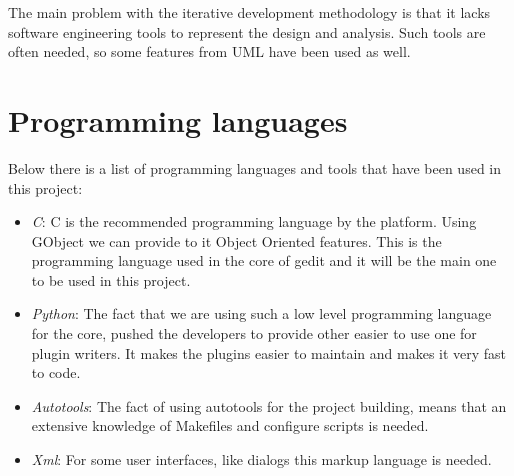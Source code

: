 The main problem with the iterative development methodology is that it lacks software engineering tools 
to represent the design and analysis.  Such tools are often needed, so some features from UML have been used as well.

\section{Programming languages}\label{sec:ProgrammingLanguages}

Below there is a list of programming languages and tools that have been used in this project:
\begin{itemize}
  \item \emph{C}: C is the recommended programming language by the platform. Using GObject we can provide to it Object 
Oriented features. This is the programming language used in the core of gedit and it will be the main one to be used in this project.
  \item \emph{Python}: The fact that we are using such a low level programming language for the core, pushed the 
developers to provide other easier to use one for plugin writers. It makes the plugins easier to maintain and makes it very fast to code.
  \item \emph{Autotools}: The fact of using autotools for the project building, means that an extensive knowledge of 
Makefiles and configure scripts is needed.
  \item \emph{Xml}: For some user interfaces, like dialogs this markup language is needed.
\end{itemize}
